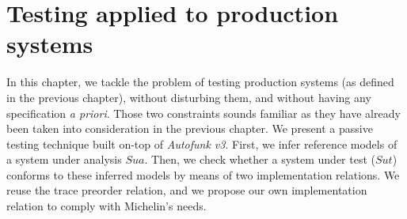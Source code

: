 %
\chapter{Testing applied to production systems}
\label{sec:testing}

In this chapter, we tackle the problem of testing production
systems (as defined in the previous chapter), without disturbing
them, and without having any specification \emph{a priori}. Those
two constraints sounds familiar as they have already been taken
into consideration in the previous chapter. We present a passive
testing technique built on-top of \emph{Autofunk v3}. First, we
infer reference models of a system under analysis $\mathit{Sua}$.
Then, we check whether a system under test ($\mathit{Sut}$)
conforms to these inferred models by means of two implementation
relations. We reuse the trace preorder relation, and we propose
our own implementation relation to comply with Michelin's needs.

\\

\minitoc

\pagebreak







\cleardoublepage
\blankpage
